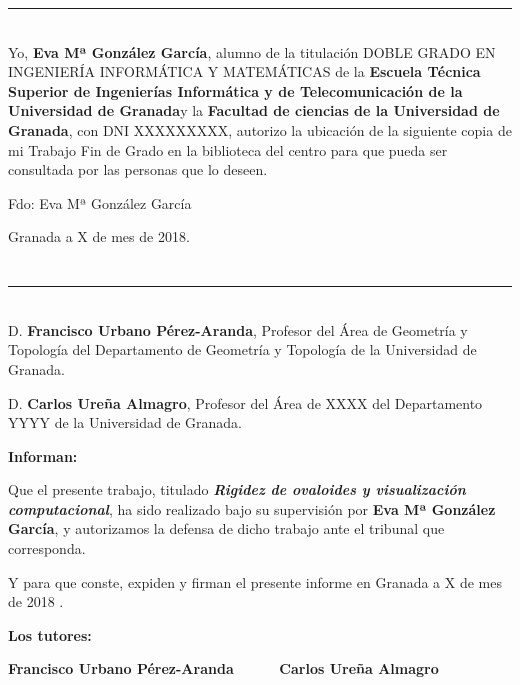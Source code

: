 \noindent\rule[-1ex]{\textwidth}{2pt}\\[4.5ex]

Yo, \textbf{Eva Mª González García}, alumno de la titulación DOBLE GRADO EN INGENIERÍA INFORMÁTICA Y MATEMÁTICAS de la \textbf{Escuela Técnica Superior
de Ingenierías Informática y de Telecomunicación de la Universidad de Granada}y la \textbf{Facultad de ciencias de la Universidad de Granada}, con DNI XXXXXXXXX, autorizo la
ubicación de la siguiente copia de mi Trabajo Fin de Grado en la biblioteca del centro para que pueda ser
consultada por las personas que lo deseen.

\vspace{6cm}

\noindent Fdo: Eva Mª González García

\vspace{2cm}

\begin{flushright}
Granada a X de mes de 2018.
\end{flushright}


\chapter*{}
\thispagestyle{empty}

\noindent\rule[-1ex]{\textwidth}{2pt}\\[4.5ex]

D. \textbf{Francisco Urbano Pérez-Aranda}, Profesor del Área de Geometría y Topología del Departamento de Geometría y Topología de la Universidad de Granada.

\vspace{0.5cm}

D. \textbf{Carlos Ureña Almagro}, Profesor del Área de XXXX del Departamento YYYY de la Universidad de Granada.


\vspace{0.5cm}

\textbf{Informan:}

\vspace{0.5cm}

Que el presente trabajo, titulado \textit{\textbf{Rigidez de ovaloides y visualización computacional}},
ha sido realizado bajo su supervisión por \textbf{Eva Mª González García}, y autorizamos la defensa de dicho trabajo ante el tribunal que corresponda.

\vspace{0.5cm}

Y para que conste, expiden y firman el presente informe en Granada a X de mes de 2018 .

\vspace{1cm}

\textbf{Los tutores:}

\vspace{5cm}

\noindent \textbf{Francisco Urbano Pérez-Aranda \ \ \ \ \ Carlos Ureña Almagro}





